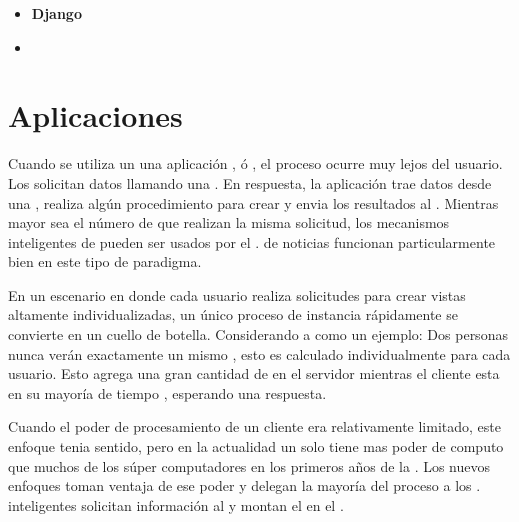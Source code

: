 \begin{itemize}
	\item \textbf{Django}
	\item \textbf{\grunttool} \cite{technology_gruntjs}
\end{itemize}


\section{Aplicaciones \web}

Cuando se utiliza un \backend \running una aplicación \java, \php ó \rails, el proceso ocurre muy lejos del usuario. Los \clients solicitan datos llamando una \uri. En respuesta, la aplicación trae datos desde una \database, realiza algún procedimiento para crear \html y envia los resultados al \client. Mientras mayor sea el número de \clients que realizan la misma solicitud, los mecanismos inteligentes de \caching pueden ser usados por el \server. \sites de noticias funcionan particularmente bien en este tipo de paradigma.

En un escenario en donde cada usuario realiza solicitudes para crear vistas altamente individualizadas, un único proceso de instancia rápidamente se convierte en un cuello de botella. Considerando a \facebook como un ejemplo: Dos personas nunca verán exactamente un mismo \facebookwall, esto es calculado individualmente para cada usuario. Esto agrega una gran cantidad de \stress en el servidor mientras el cliente esta en su mayoría de tiempo \idle, esperando una respuesta.

Cuando el poder de procesamiento de un cliente era relativamente limitado, este enfoque tenia sentido, pero en la actualidad un solo \smartphone tiene mas poder de computo que muchos de los súper computadores en los primeros años de la \web. Los nuevos enfoques toman ventaja de ese poder y delegan la mayoría del proceso a los \clients. \frontends inteligentes solicitan información al \server y montan el \htmldom en el \browser.

